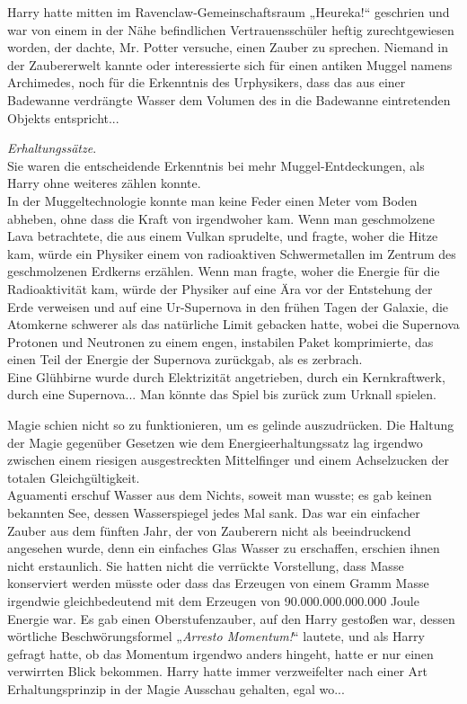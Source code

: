 {Harry hatte mitten im Ravenclaw-Gemeinschaftsraum „Heureka!“ geschrien und war von einem in der Nähe befindlichen Vertrauensschüler heftig zurechtgewiesen worden, der dachte, Mr. Potter versuche, einen Zauber zu sprechen. Niemand in der Zaubererwelt kannte oder interessierte sich für einen antiken Muggel namens Archimedes, noch für die Erkenntnis des Urphysikers, dass das aus einer Badewanne verdrängte Wasser dem Volumen des in die Badewanne eintretenden Objekts entspricht...

\emph{Erhaltungssätze}.\\ Sie waren die entscheidende Erkenntnis bei mehr Muggel-Entdeckungen, als Harry ohne weiteres zählen konnte.\\ In der Muggeltechnologie konnte man keine Feder einen Meter vom Boden abheben, ohne dass die Kraft von irgendwoher kam. Wenn man geschmolzene Lava betrachtete, die aus einem Vulkan sprudelte, und fragte, woher die Hitze kam, würde ein Physiker einem von radioaktiven Schwermetallen im Zentrum des geschmolzenen Erdkerns erzählen. Wenn man fragte, woher die Energie für die Radioaktivität kam, würde der Physiker auf eine Ära vor der Entstehung der Erde verweisen und auf eine Ur-Supernova in den frühen Tagen der Galaxie, die Atomkerne schwerer als das natürliche Limit gebacken hatte, wobei die Supernova Protonen und Neutronen zu einem engen, instabilen Paket komprimierte, das einen Teil der Energie der Supernova zurückgab, als es zerbrach.\\ Eine Glühbirne wurde durch Elektrizität angetrieben, durch ein Kernkraftwerk, durch eine Supernova... Man könnte das Spiel bis zurück zum Urknall spielen.

Magie schien nicht so zu funktionieren, um es gelinde auszudrücken. Die Haltung der Magie gegenüber Gesetzen wie dem Energieerhaltungssatz lag irgendwo zwischen einem riesigen ausgestreckten Mittelfinger und einem Achselzucken der totalen Gleichgültigkeit.\\ Aguamenti erschuf Wasser aus dem Nichts, soweit man wusste; es gab keinen bekannten See, dessen Wasserspiegel jedes Mal sank. Das war ein einfacher Zauber aus dem fünften Jahr, der von Zauberern nicht als beeindruckend angesehen wurde, denn ein einfaches Glas Wasser zu erschaffen, erschien ihnen nicht erstaunlich. Sie hatten nicht die verrückte Vorstellung, dass Masse konserviert werden müsste oder dass das Erzeugen von einem Gramm Masse irgendwie gleichbedeutend mit dem Erzeugen von 90.000.000.000.000 Joule Energie war. Es gab einen Oberstufenzauber, auf den Harry gestoßen war, dessen wörtliche Beschwörungsformel „\emph{Arresto Momentum!}“ lautete, und als Harry gefragt hatte, ob das Momentum irgendwo anders hingeht, hatte er nur einen verwirrten Blick bekommen. Harry hatte immer verzweifelter nach einer Art Erhaltungsprinzip in der Magie Ausschau gehalten, egal wo...

}
